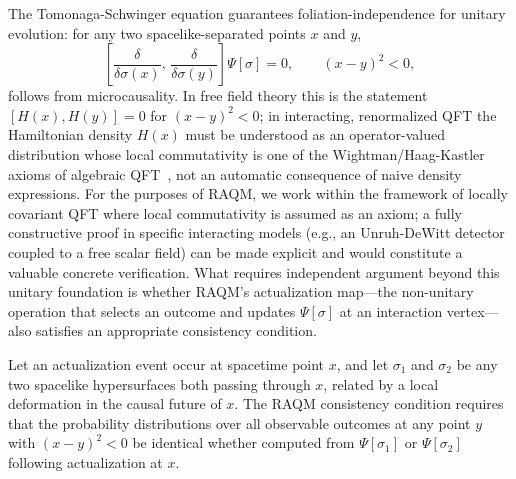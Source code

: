 \documentclass[11pt,a4paper]{article}
\theoremstyle{plain}
\theoremstyle{definition}
\theoremstyle{remark}
\begin{document}
The Tomonaga-Schwinger equation guarantees foliation-independence for unitary
evolution: for any two spacelike-separated points $x$ and $y$,
\begin{equation}
  \left[\frac{\delta}{\delta\sigma(x)},\,
        \frac{\delta}{\delta\sigma(y)}\right]\Psi[\sigma] = 0,
  \qquad (x-y)^2 < 0,
\end{equation}
follows from microcausality. In free field theory this is the statement $[H(x),
H(y)] = 0$ for $(x-y)^2 < 0$; in interacting, renormalized QFT the Hamiltonian
density $H(x)$ must be understood as an operator-valued distribution whose local
commutativity is one of the Wightman/Haag-Kastler axioms of algebraic
QFT~\citep{HaagKastler1964}, not an automatic consequence of naive density
expressions. For the purposes of RAQM, we work within the framework of locally
covariant QFT where local commutativity is assumed as an axiom; a fully
constructive proof in specific interacting models (e.g., an Unruh-DeWitt detector
coupled to a free scalar field) can be made explicit and would constitute a
valuable concrete verification. What requires independent argument beyond this
unitary foundation is whether RAQM's actualization map---the non-unitary operation
that selects an outcome and updates $\Psi[\sigma]$ at an interaction vertex---also
satisfies an appropriate consistency condition.

Let an actualization event occur at spacetime point $x$, and let $\sigma_1$ and
$\sigma_2$ be any two spacelike hypersurfaces both passing through $x$, related by
a local deformation in the causal future of $x$. The RAQM consistency condition
requires that the probability distributions over all observable outcomes at any
point $y$ with $(x-y)^2 < 0$ be identical whether computed from $\Psi[\sigma_1]$
or $\Psi[\sigma_2]$ following actualization at $x$.
\end{document}
